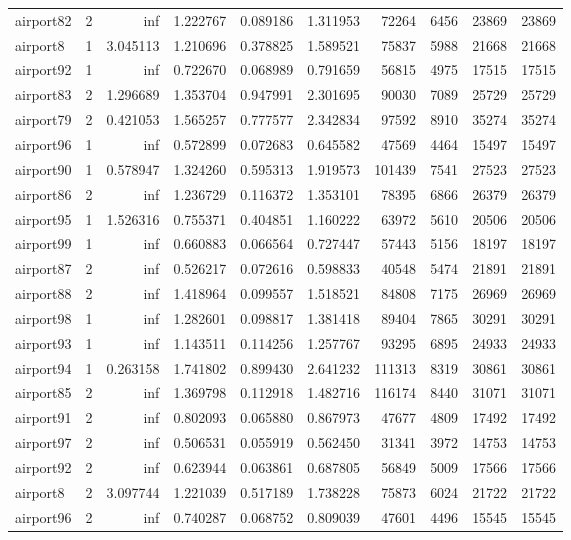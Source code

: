 \begin{longtable}{|l|r|r|r|r|r|r|r|r|r|}
airport82 & 2 & inf & 1.222767 & 0.089186 & 1.311953 & 72264 & 6456 & 23869 & 23869 \\
airport8 & 1 & 3.045113 & 1.210696 & 0.378825 & 1.589521 & 75837 & 5988 & 21668 & 21668 \\
airport92 & 1 & inf & 0.722670 & 0.068989 & 0.791659 & 56815 & 4975 & 17515 & 17515 \\
airport83 & 2 & 1.296689 & 1.353704 & 0.947991 & 2.301695 & 90030 & 7089 & 25729 & 25729 \\
airport79 & 2 & 0.421053 & 1.565257 & 0.777577 & 2.342834 & 97592 & 8910 & 35274 & 35274 \\
airport96 & 1 & inf & 0.572899 & 0.072683 & 0.645582 & 47569 & 4464 & 15497 & 15497 \\
airport90 & 1 & 0.578947 & 1.324260 & 0.595313 & 1.919573 & 101439 & 7541 & 27523 & 27523 \\
airport86 & 2 & inf & 1.236729 & 0.116372 & 1.353101 & 78395 & 6866 & 26379 & 26379 \\
airport95 & 1 & 1.526316 & 0.755371 & 0.404851 & 1.160222 & 63972 & 5610 & 20506 & 20506 \\
airport99 & 1 & inf & 0.660883 & 0.066564 & 0.727447 & 57443 & 5156 & 18197 & 18197 \\
airport87 & 2 & inf & 0.526217 & 0.072616 & 0.598833 & 40548 & 5474 & 21891 & 21891 \\
airport88 & 2 & inf & 1.418964 & 0.099557 & 1.518521 & 84808 & 7175 & 26969 & 26969 \\
airport98 & 1 & inf & 1.282601 & 0.098817 & 1.381418 & 89404 & 7865 & 30291 & 30291 \\
airport93 & 1 & inf & 1.143511 & 0.114256 & 1.257767 & 93295 & 6895 & 24933 & 24933 \\
airport94 & 1 & 0.263158 & 1.741802 & 0.899430 & 2.641232 & 111313 & 8319 & 30861 & 30861 \\
airport85 & 2 & inf & 1.369798 & 0.112918 & 1.482716 & 116174 & 8440 & 31071 & 31071 \\
airport91 & 2 & inf & 0.802093 & 0.065880 & 0.867973 & 47677 & 4809 & 17492 & 17492 \\
airport97 & 2 & inf & 0.506531 & 0.055919 & 0.562450 & 31341 & 3972 & 14753 & 14753 \\
airport92 & 2 & inf & 0.623944 & 0.063861 & 0.687805 & 56849 & 5009 & 17566 & 17566 \\
airport8 & 2 & 3.097744 & 1.221039 & 0.517189 & 1.738228 & 75873 & 6024 & 21722 & 21722 \\
airport96 & 2 & inf & 0.740287 & 0.068752 & 0.809039 & 47601 & 4496 & 15545 & 15545 \\

\end{longtable}
